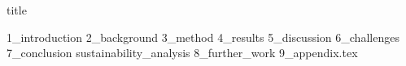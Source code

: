 \documentclass{article}
\begin{document}
{title}

\frontmatter

\tableofcontents


\mainmatter


{1_introduction}
{2_background}
{3_method}
{4_results}
{5_discussion}
{6_challenges}
{7_conclusion}
{sustainability_analysis}
{8_further_work}
{9_appendix.tex}
\newpage



\end{document}
